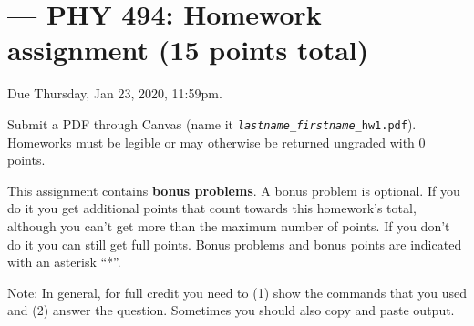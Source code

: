 \documentclass[letterpaper]{scrartcl}
\newcommand{\anumber}{1}
\begin{document}

\setcounter{section}{\anumber}
\addtocounter{section}{-1}
\section{ --- PHY 494: Homework assignment (15 points total)}

\noindent Due Thursday, Jan 23, 2020, 11:59pm.

\noindent Submit a PDF through Canvas (name it
\texttt{\emph{lastname}\_\emph{firstname}\_hw\anumber.pdf}).
Homeworks must be legible or may otherwise be returned ungraded with 0
points.

This assignment contains \textbf{bonus problems}. A bonus problem is
optional. If you do it you get additional points that count towards
this homework's total, although you can't get more than the maximum
number of points. If you don't do it you can still get full
points. Bonus problems and bonus points are indicated with an asterisk
``*''.

Note: In general, for full credit you need to (1) show the commands
that you used and (2) answer the question. Sometimes you should also
copy and paste output.
\end{document}
